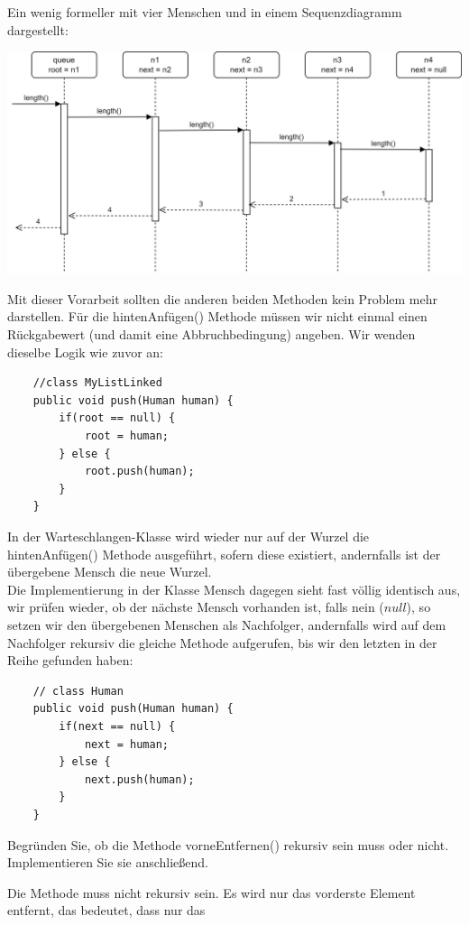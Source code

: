 \documentclass{article}
\begin{document}
Ein wenig formeller mit vier Menschen und in einem Sequenzdiagramm dargestellt:
\begin{center}
    \includegraphics[scale = 0.20]{../../media/length_sequence.png}
\end{center}
Mit dieser Vorarbeit sollten die anderen beiden Methoden kein Problem mehr darstellen. Für die hintenAnfügen() Methode 
müssen wir nicht einmal einen Rückgabewert (und damit eine Abbruchbedingung) angeben. Wir wenden dieselbe Logik wie zuvor an:
\begin{verbatim}
    //class MyListLinked
    public void push(Human human) {
        if(root == null) {
            root = human;
        } else {
            root.push(human);
        }
    }
\end{verbatim}
In der Warteschlangen-Klasse wird wieder nur auf der Wurzel die hintenAnfügen() Methode ausgeführt, sofern diese 
existiert, andernfalls ist der übergebene Mensch die neue Wurzel. \\
Die Implementierung in der Klasse Mensch dagegen sieht fast völlig identisch aus, wir prüfen wieder, ob der nächste 
Mensch vorhanden ist, falls nein ($null$), so setzen wir den übergebenen Menschen als Nachfolger, andernfalls 
wird auf dem Nachfolger rekursiv die gleiche Methode aufgerufen, bis wir den letzten in der Reihe gefunden haben:
\begin{verbatim}
    // class Human
    public void push(Human human) {
        if(next == null) {
            next = human;
        } else {
            next.push(human);
        }
    }
\end{verbatim}
\begin{task}{1}
    Begründen Sie, ob die Methode vorneEntfernen() rekursiv sein muss oder nicht. Implementieren Sie sie anschließend.
\end{task}
Die Methode muss nicht rekursiv sein. Es wird nur das vorderste Element entfernt, das bedeutet, dass nur das 
\end{document}
